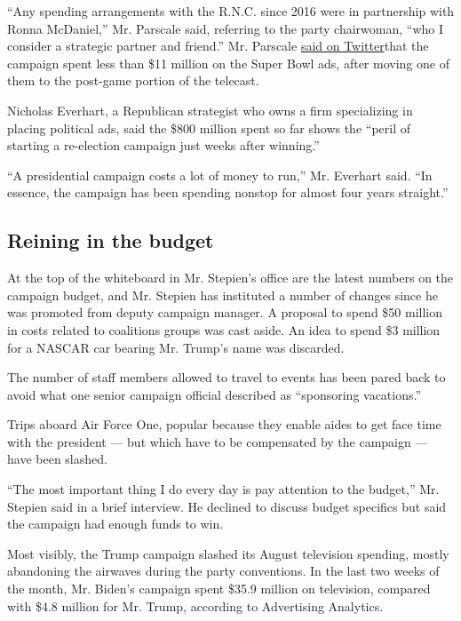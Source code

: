 ``Any spending arrangements with the R.N.C. since 2016 were in
partnership with Ronna McDaniel,'' Mr. Parscale said, referring to the
party chairwoman, ``who I consider a strategic partner and friend.'' Mr.
Parscale
\href{https://twitter.com/parscale/status/1303088755943919618}{said on
Twitter}that the campaign spent less than \$11 million on the Super Bowl
ads, after moving one of them to the post-game portion of the telecast.

Nicholas Everhart, a Republican strategist who owns a firm specializing
in placing political ads, said the \$800 million spent so far shows the
``peril of starting a re-election campaign just weeks after winning.''

``A presidential campaign costs a lot of money to run,'' Mr. Everhart
said. ``In essence, the campaign has been spending nonstop for almost
four years straight.''

\hypertarget{reining-in-the-budget}{%
\subsection{Reining in the budget}\label{reining-in-the-budget}}

At the top of the whiteboard in Mr. Stepien's office are the latest
numbers on the campaign budget, and Mr. Stepien has instituted a number
of changes since he was promoted from deputy campaign manager. A
proposal to spend \$50 million in costs related to coalitions groups was
cast aside. An idea to spend \$3 million for a NASCAR car bearing Mr.
Trump's name was discarded.

The number of staff members allowed to travel to events has been pared
back to avoid what one senior campaign official described as
``sponsoring vacations.''

Trips aboard Air Force One, popular because they enable aides to get
face time with the president --- but which have to be compensated by the
campaign --- have been slashed.

``The most important thing I do every day is pay attention to the
budget,'' Mr. Stepien said in a brief interview. He declined to discuss
budget specifics but said the campaign had enough funds to win.

Most visibly, the Trump campaign slashed its August television spending,
mostly abandoning the airwaves during the party conventions. In the last
two weeks of the month, Mr. Biden's campaign spent \$35.9 million on
television, compared with \$4.8 million for Mr. Trump, according to
Advertising Analytics.

